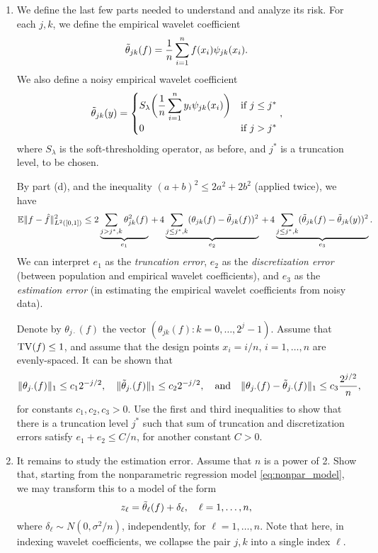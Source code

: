 \documentclass{article}
\begin{document}
\begin{enumerate}[label=(\alph*)]
\item We define the last few parts needed to understand \smash{$\hf$} and 
  analyze its risk. For each $j,k$, we define the empirical wavelet coefficient 
  \[
  \tilde\theta_{jk}(f) = \frac{1}{n} \sum_{i=1}^n f(x_i) \psi_{jk}(x_i).
  \] 
  We also define a noisy empirical wavelet coefficient 
  \[
  \tilde\theta_{jk}(y) = \begin{cases}
  \displaystyle
  S_\lambda \bigg( \frac{1}{n} \sum_{i=1}^n y_i \psi_{jk}(x_i) 
  \bigg) & \text{if $j \leq j^*$} \\
  0 & \text{if $j > j ^*$}
  \end{cases},
  \]
  where $S_\lambda$ is the soft-thresholding operator, as before, and $j^*$ is a
  truncation level, to be chosen. 

  By part (d), and the inequality $(a+b)^2 \leq 2a^2 + 2b^2$ (applied twice), we
  have 
  \[
  \mathbb{E} \|f - \hat{f}\|_{L^2([0,1])}^2 \leq 
  2\underbrace{\sum_{j > j^*,k} \theta_{jk}^2(f)}_{e_1} 
  \,+\,
  4\underbrace{\sum_{j \leq j^*,k} (\theta_{jk}(f) - \tilde\theta_{jk}(f))^2}_{e_2}
  \,+\, 
  4\underbrace{\sum_{j \leq j^*,k} (\tilde\theta_{jk}(f) - \tilde\theta_{jk}(y))^2}_{e_3}.
  \]
  We can interpret $e_1$ as the \emph{truncation error}, $e_2$ as the
  \emph{discretization error} (between population and empirical wavelet
  coefficients), and $e_3$ as the \emph{estimation error} (in estimating the
  empirical wavelet coefficients from noisy data). 
  
  Denote by $\theta_{j \cdot}(f)$ the vector $(\theta_{jk}(f) : k =
  0,\dots,2^j-1)$. Assume that $\mathrm{TV}(f) \leq 1$, and assume that the design
  points $x_i = i/n$, $i=1,\dots,n$ are evenly-spaced. It can be shown that 
  \begin{equation}
  \label{eq:besov_condition}
  \| \theta_{j \cdot}(f) \|_1 \leq c_1 2^{-j/2}, \quad
  \| \tilde\theta_{j \cdot}(f) \|_1 \leq c_2 2^{-j/2}, \quad \text{and} \quad 
  \| \theta_{j \cdot}(f) - \tilde\theta_{j \cdot}(f) \|_1 \leq c_3 \frac{2^{j/2}}{n}, 
  \end{equation}
  for constants $c_1,c_2,c_3> 0$. Use the first and third inequalities to show 
  that there is a truncation level $j^*$ such that sum of truncation and
  discretization errors satisfy $e_1 + e_2 \leq C/n$, for another constant
  $C>0$.       
  \marginpar{\small [2 pts]}

\item It remains to study the estimation error. Assume that $n$ is a power of
  2. Show that, starting from the nonparametric regression model
  \eqref{eq:nonpar_model}, we may transform this to a model of the form   
  \marginpar{\small [3 pts]}
  \[
  z_\ell = \tilde\theta_\ell(f) + \delta_\ell, \quad \ell=1,\dots,n,
  \]
  where $\delta_\ell \sim N(0,\sigma^2/n)$, independently, for
  $\ell=1,\dots,n$. Note that here, in indexing wavelet coefficients, we
  collapse the pair $j,k$ into a single index $\ell$. 


\end{enumerate}
\end{document}
